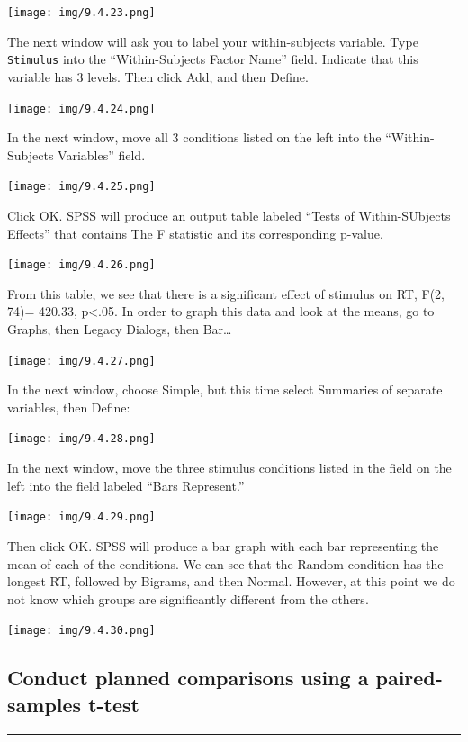 \documentclass[]{book}
\begin{document}
\texttt{[image: img/9.4.23.png]}

The next window will ask you to label your within-subjects variable.
Type \texttt{Stimulus} into the ``Within-Subjects Factor Name'' field.
Indicate that this variable has 3 levels. Then click {Add}, and then
{Define}.

\texttt{[image: img/9.4.24.png]}

In the next window, move all 3 conditions listed on the left into the
``Within-Subjects Variables'' field.

\texttt{[image: img/9.4.25.png]}

Click {OK}. SPSS will produce an output table labeled ``Tests of
Within-SUbjects Effects'' that contains The F statistic and its
corresponding p-value.

\texttt{[image: img/9.4.26.png]}

From this table, we see that there is a significant effect of stimulus
on RT, F(2, 74)= 420.33, p\textless{}.05. In order to graph this data
and look at the means, go to {Graphs}, then {Legacy Dialogs}, then
{Bar\ldots{}}

\texttt{[image: img/9.4.27.png]}

In the next window, choose {Simple}, but this time select {Summaries of
separate variables}, then {Define}:

\texttt{[image: img/9.4.28.png]}

In the next window, move the three stimulus conditions listed in the
field on the left into the field labeled ``Bars Represent.''

\texttt{[image: img/9.4.29.png]}

Then click {OK}. SPSS will produce a bar graph with each bar
representing the mean of each of the conditions. We can see that the
Random condition has the longest RT, followed by Bigrams, and then
Normal. However, at this point we do not know which groups are
significantly different from the others.

\texttt{[image: img/9.4.30.png]}

\subsection{Conduct planned comparisons using a paired-samples
t-test}\label{conduct-planned-comparisons-using-a-paired-samples-t-test}

\begin{center}\rule{0.5\linewidth}{0.5pt}\end{center}
\end{document}
